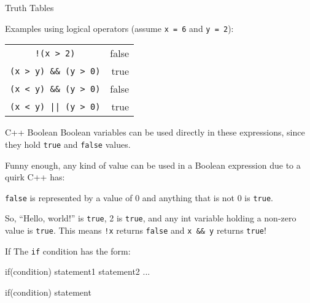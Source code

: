 \documentclass[../lecture3-flowofcontrol.tex]{subfiles}
\begin{document}
\begin{frame}[fragile]{Truth Tables}
    \begin{center}
        Examples using logical operators (assume \verb|x = 6| and \verb|y = 2|):
    \end{center}

    \begin{table}
        \center
        \begin{tabular}{cr}
            \pause \verb|!(x > 2)|           & \pause false \\
            \pause \verb|(x > y) && (y > 0)| & \pause true  \\
            \pause \verb|(x < y) && (y > 0)| & \pause false \\
            \pause \verb+(x < y) || (y > 0)+ & \pause true  \\
        \end{tabular}
    \end{table}
\end{frame}

\begin{frame}[fragile]{C++ Boolean}
    Boolean variables can be used directly in these expressions, since they hold \verb|true| and \verb|false| values. \newline

    Funny enough, any kind of value can be used in a Boolean expression due to a quirk C++ has:
    \begin{center}
        \verb|false| is represented by a value of 0 and anything that is not 0 is \verb|true|. \newline
    \end{center}

    So, “Hello, world!” is \verb|true|, 2 is \verb|true|, and any int variable holding a non-zero value is \verb|true|. This means \verb|!x| returns \verb|false| and \verb|x && y| returns \verb|true|!
\end{frame}


\begin{frame}[fragile]{If}
    The \verb|if| condition has the form:
\begin{cppcode}[]
if(condition)
{
    statement1
    statement2
    ...
}
\end{cppcode}

\begin{cppcode}[]
if(condition)
    statement
\end{cppcode}
\end{frame}
\end{document}

